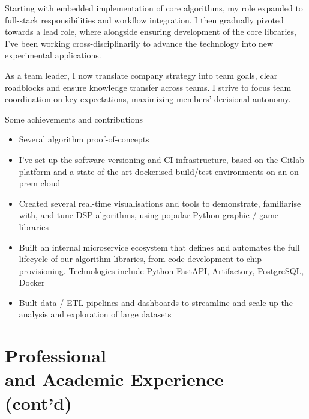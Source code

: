 \begin{resume}
{Starting with embedded implementation of core algorithms, my role expanded to full-stack responsibilities and workflow integration.
I then gradually pivoted towards a lead role, where alongside ensuring development of the core libraries, I've been working cross-disciplinarily to advance the technology into new experimental applications.

As a team leader, I now translate company strategy into team goals, clear roadblocks and ensure knowledge transfer across teams.
I strive to focus team coordination on key expectations, maximizing members' decisional autonomy.

Some achievements and contributions
\begin{itemize}
 \item Several algorithm proof-of-concepts   
 \item I've set up the software versioning and CI infrastructure, based on the Gitlab platform and a state of the art dockerised build/test environments on an on-prem cloud
 \item Created several real-time visualisations and tools to demonstrate, familiarise with, and tune DSP algorithms, using popular Python graphic / game libraries
 \item Built an internal microservice ecosystem that defines and automates the full lifecycle of our algorithm libraries, from code development to chip provisioning. Technologies include Python FastAPI, Artifactory, PostgreSQL, Docker
 \item Built data / ETL pipelines and dashboards to streamline and scale up the analysis and exploration of large datasets
\end{itemize}

}
\pagebreak
\section{Professional \\and Academic Experience\\(cont'd)} 


\end{resume}
